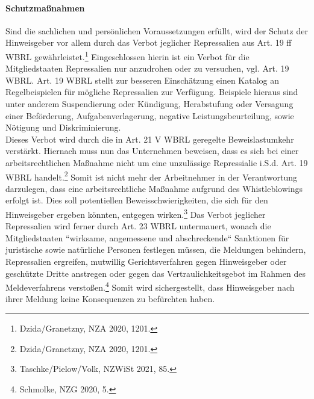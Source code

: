 \paragraph{Schutzmaßnahmen}
Sind die sachlichen und persönlichen Voraussetzungen erfüllt, wird der Schutz der Hinweisgeber vor allem durch das Verbot jeglicher Repressalien aus Art. 19 ff WBRL gewährleistet.\footnote{Dzida/Granetzny, NZA 2020, 1201.}
Eingeschlossen hierin ist ein Verbot für die Mitgliedstaaten Repressalien nur anzudrohen oder zu versuchen, vgl. Art. 19 WBRL.
Art. 19 WBRL stellt zur besseren Einschätzung einen Katalog an Regelbeispielen für mögliche Repressalien zur Verfügung.
Beispiele hieraus sind unter anderem Suspendierung oder Kündigung, Herabstufung oder Versagung einer Beförderung, Aufgabenverlagerung, negative Leistungsbeurteilung, sowie Nötigung und Diskriminierung.\\
Dieses Verbot wird durch die in Art. 21 V WBRL geregelte Beweislastumkehr verstärkt.
Hiernach muss nun das Unternehmen beweisen, dass es sich bei einer arbeitsrechtlichen Maßnahme nicht um eine unzulässige Repressialie i.S.d. Art. 19 WBRL handelt.\footnote{Dzida/Granetzny, NZA 2020, 1201.}
Somit ist nicht mehr der Arbeitnehmer in der Verantwortung darzulegen, dass eine arbeitsrechtliche Maßnahme aufgrund des Whistleblowings erfolgt ist.
Dies soll potentiellen Beweisschwierigkeiten, die sich für den Hinweisgeber ergeben könnten, entgegen wirken.\footnote{Taschke/Pielow/Volk, NZWiSt 2021, 85.}
Das Verbot jeglicher Repressalien wird ferner durch Art. 23 WBRL untermauert, wonach die Mitgliedstaaten “wirksame, angemessene und abschreckende“ Sanktionen für juristische sowie natürliche Personen festlegen müssen, die Meldungen behindern, Repressalien ergreifen, mutwillig Gerichtsverfahren gegen Hinweisgeber oder geschützte Dritte anstregen oder gegen das Vertraulichkeitsgebot im Rahmen des Meldeverfahrens verstoßen.\footnote{Schmolke, NZG 2020, 5.}
Somit wird sichergestellt, dass Hinweisgeber nach ihrer Meldung keine Konsequenzen zu befürchten haben.

